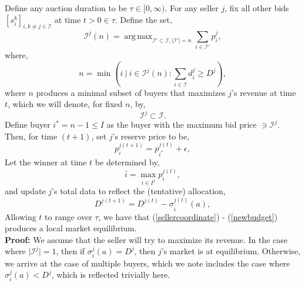 \documentclass[12pt]{article}
\theoremstyle{definition}
\newcommand{\mcI}{\mathcal{I}}
\newcommand{\g}{\sigma}
\DeclareMathOperator*{\argmax}{arg\,max}
\begin{document}
\begin{multicols}{2}
{
\label{sellerstrategy}
Define any auction duration to be $\tau \in [0,\infty)$. 
For any seller $j$, fix all other bids $[s_i^k]_{i,k\ne j \in\mcI}$ at time $t>0\in\tau$.
Define the set,
$$
    \mcI^j(n) =\argmax_{{\mcI}' \subset \mcI, \vert{\mcI}'\vert =
n}\sum_{i\in{\mcI}'} p_i^j,
$$
where,
\begin{equation}\label{sellercoordinate}
    n = \min( i \ \vert \ i \in\mcI^j(n) : \displaystyle\sum_{i\in\mcI} d_i^j \ge
D^j),
\end{equation} 
where $n$ produces a minimal subset 
of buyers that maximizes $j$'s revenue at time $t$, which we will
denote, for fixed $n$, by,
\begin{equation}\label{buyers}
    \mcI^j \subset \mcI.
\end{equation} 
Define buyer $i^* = n-1 \le I$ as the buyer with the maximum bid price $\ni
\mcI^j$.
Then, for time $(t+1)$, set $j$'s reserve price to be, 
\begin{equation}\label{newprice}
    p_i^{j(t+1)} = p_{i^*}^{j(t)} + \epsilon,
\end{equation}
Let the winner at time $t$ be determined by,
\begin{equation}\label{winner}
    \bar{i} = \displaystyle\max_{i\in I^j} p_i^{j(t)},
\end{equation}
and update $j$'s total data to reflect the (tentative) allocation,
\begin{equation}\label{newdata}
    D^{j(t+1)} = D^{j(t)} - \g_{\bar{i}}^{j(t)}(a),
\end{equation}
Allowing $t$ to range over $\tau$, we have that (\ref{sellercoordinate}) -
(\ref{newbudget}) produces a local market equilibrium. 
}\\
\textbf{Proof:}
We assume that the seller will try to maximize its revenue. In the case where
$\vert\mcI^j\vert =1$, then if $\g_i^j(a)=D^j$, then $j$'s market is at equilibrium.
Otherwise, we arrive at the case of multiple buyers, which we note includes the
case where $\g_i^j(a) < D^j$, which is reflected trivially here.


\end{multicols}
\end{document}
